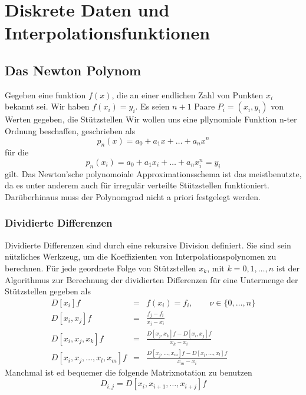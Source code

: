 \section{Diskrete Daten und Interpolationsfunktionen}
\subsection{Das Newton Polynom}\label{subsec:newton}
Gegeben eine funktion $f(x)$, die an einer endlichen Zahl von Punkten $x_i$ bekannt sei.
Wir haben $f(x_i)=y_i$.  Es seien $n+1$ Paare $P_i=(x_i,y_i)$ von Werten gegeben, die Stützstellen
Wir wollen uns eine pllynomiale Funktion n-ter Ordnung beschaffen, geschrieben als
\[p_n(x)=a_0+a_1 x+\dots +a_n x^n\]
für die
\[p_n(x_i)=a_0+a_1 x_i+\dots +a_n x_i^n=y_i\]
gilt. Das Newton'sche polynomoiale Approximationsschema ist das meistbenutzte,
da es unter anderem auch für irregulär verteilte Stützstellen funktioniert.
Darüberhinaus muss der Polynomgrad nicht a priori festgelegt werden.
\subsubsection{Dividierte Differenzen}
Dividierte Differenzen sind durch eine rekursive Division definiert. Sie sind sein nützliches Werkzeug, um die Koeffizienten von Interpolationspolynomen zu berechnen.
Für jede geordnete Folge von Stützstellen 
$x_k$, mit $k=0,1,\dots,n$ ist der Algorithmus zur Berechnung der dividierten Differenzen für eine Untermenge der Stützstellen gegeben als
\begin{eqnarray}
	\label{eq:divdiffs}
   D[x_i] f&=& f(x_i)=f_i, \qquad \nu \in \{ 0,\ldots,n\}\\
   D[x_i,x_j] f&=& \frac{f_j-f_i}{x_j-x_i}\nonumber\\
   D[x_i,x_j,x_k] f&=& \frac{D[x_j,x_k]f-D[x_i,x_j]f}{x_k-x_i}\nonumber\\
   D[x_i,x_j,\ldots,x_l,x_m] f&=& \frac{D[x_j,\dots,x_m]f-D[x_i,\dots,x_l]f}{x_m-x_i}\nonumber
\end{eqnarray} 
Manchmal ist ed bequemer die folgende Matrixnotation zu benutzen
\begin{equation} 
	D_{i,j}=D[x_i,x_{i+1},\dots,x_{i+j}]f
	\label{eq:invdivdiffs}
\end{equation}
